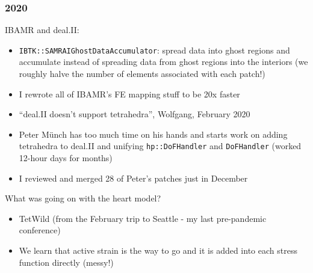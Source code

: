 \documentclass[8pt]{beamer}
\begin{document}
\begin{frame}
  \frametitle{2020}
  IBAMR and deal.II:
  \begin{itemize}
    \item[$\blacksquare$] \texttt{IBTK::SAMRAIGhostDataAccumulator}: spread data into ghost
      regions and accumulate instead of spreading data from ghost regions into
      the interiors (we roughly halve the number of elements associated with each
      patch!)
    \item[$\blacksquare$] I rewrote all of IBAMR's FE mapping stuff to be 20x faster
    \item[$\blacksquare$] ``deal.II doesn't support tetrahedra'', Wolfgang, February 2020
    \item[$\blacksquare$] Peter M\"unch has too much time on his hands and starts work on
      adding tetrahedra to deal.II and unifying \texttt{hp::DoFHandler} and
      \texttt{DoFHandler} (worked 12-hour days for months)
    \item[$\blacksquare$] I reviewed and merged 28 of Peter's patches just in December
  \end{itemize}
  \vfill

  What was going on with the heart model?
  \begin{itemize}
    \item[$\blacksquare$] TetWild (from the February trip to Seattle - my last pre-pandemic conference)
    \item[$\blacksquare$] We learn that active strain is the way to go and it is added into each
      stress function directly (messy!)
  \end{itemize}
\end{frame}
\end{document}

